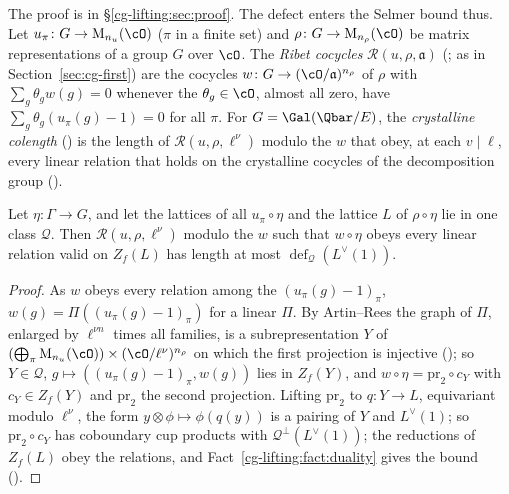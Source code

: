 The proof is in \S\ref{cg-lifting:sec:proof}. The defect enters the Selmer bound thus. Let
$u_\pi\colon G\to\mathrm M_{n_u}(\cO)$ ($\pi$ in a finite set) and $\rho\colon G\to\mathrm M_{n_\rho}(\cO)$ be matrix representations of a group $G$ over $\cO$. The
\emph{Ribet cocycles} $\mathcal R(u,\rho,\mathfrak a)$ (; as in Section~\ref{sec:cg-first}) are the cocycles
$w\colon G\to(\cO/\mathfrak a)^{n_\rho}$ of $\rho$ with $\sum_g\theta_gw(g)=0$ whenever the $\theta_g\in\cO$, almost all zero,
have $\sum_g\theta_g(u_\pi(g)-1)=0$ for all $\pi$. For $G=\Gal(\Qbar/E)$, the
\emph{crystalline colength} () is the length of
$\mathcal R(u,\rho,\ell^\nu)$ modulo the $w$ that obey, at each $v\mid\ell$, every linear relation that
holds on the crystalline cocycles of the decomposition group ().

\begin{proposition}\label{cg-lifting:prop:tatedual}
Let $\eta\colon\Gamma\to G$, and let the lattices of all $u_\pi\circ\eta$ and the lattice $L$ of
$\rho\circ\eta$ lie in one class $\mathcal Q$. Then $\mathcal R(u,\rho,\ell^\nu)$ modulo the $w$ such
that $w\circ\eta$ obeys every linear relation valid on $Z_f(L)$ has length at most
$\operatorname{def}_{\mathcal Q}(L^\vee(1))$.
\end{proposition}

\begin{proof}
As $w$ obeys every relation among the $(u_\pi(g)-1)_\pi$, $w(g)=\Pi((u_\pi(g)-1)_\pi)$ for a linear
$\Pi$. By Artin--Rees the graph of $\Pi$, enlarged by $\ell^{\nu n}$ times all families, is a
subrepresentation $Y$ of $(\bigoplus_\pi\mathrm M_{n_u}(\cO))\times(\cO/\ell^\nu)^{n_\rho}$ on which the first
projection is injective (); so
$Y\in\mathcal Q$, $g\mapsto((u_\pi(g)-1)_\pi,w(g))$ lies in $Z_f(Y)$, and $w\circ\eta=\mathrm{pr}_2\circ c_Y$ with
$c_Y\in Z_f(Y)$ and $\mathrm{pr}_2$ the second projection. Lifting $\mathrm{pr}_2$ to $q\colon Y\to L$, equivariant modulo
$\ell^\nu$, the form $y\otimes\phi\mapsto\phi(q(y))$ is a pairing of $Y$ and $L^\vee(1)$; so
$\mathrm{pr}_2\circ c_Y$ has coboundary cup products with $\mathcal Q^\perp(L^\vee(1))$; the reductions of $Z_f(L)$
obey the relations, and Fact~\ref{cg-lifting:fact:duality} gives the bound ().
\end{proof}

